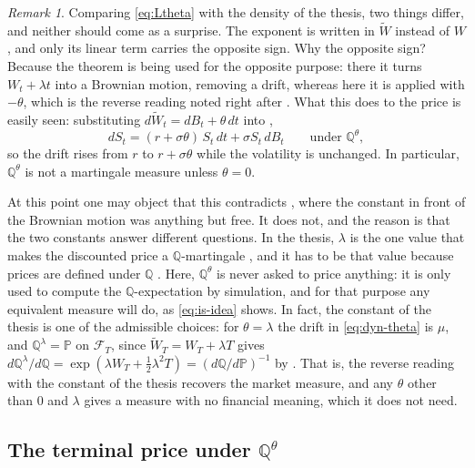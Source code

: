 \documentclass[11pt,a4paper]{article}
\theoremstyle{plain}
\theoremstyle{definition}
\theoremstyle{remark}
\newtheorem{remark}[theorem]{Remark}
\newcommand{\PP}{\mathbb{P}}
\newcommand{\Q}{\mathbb{Q}}
\newcommand{\F}{\mathcal{F}}
\newcommand{\1}{\mathbf{1}}
\newcommand{\Wt}{\widetilde{W}}
\newcommand{\Qt}{\Q^{\theta}}
\begin{document}
\begin{remark}\label{rem:sign}
Comparing \eqref{eq:Ltheta} with the density \cite[(5.12)]{tfg} of the thesis, two things differ, and neither should come as a surprise. The exponent is written in $\Wt$ instead of $W$, and only its linear term carries the opposite sign. Why the opposite sign? Because the theorem is being used for the opposite purpose: there it turns $W_t + \lambda t$ into a Brownian motion, removing a drift, whereas here it is applied with $-\theta$, which is the reverse reading noted right after \cite[Thm~4.20]{tfg}. What this does to the price is easily seen: substituting $d\Wt_t = dB_t + \theta\, dt$ into \cite[(5.15)]{tfg},
\begin{equation}\label{eq:dyn-theta}
  dS_t = (r + \sigma\theta)\, S_t\, dt + \sigma S_t\, dB_t \qquad \text{under } \Qt ,
\end{equation}
so the drift rises from $r$ to $r + \sigma\theta$ while the volatility is unchanged. In particular, $\Qt$ is not a martingale measure unless $\theta = 0$.

At this point one may object that this contradicts \cite[(5.11)]{tfg}, where the constant in front of the Brownian motion was anything but free. It does not, and the reason is that the two constants answer different questions. In the thesis, $\lambda$ is the one value that makes the discounted price a $\Q$-martingale \cite[(5.14)]{tfg}, and it has to be that value because prices are defined under $\Q$ \cite[Thm~5.7]{tfg}. Here, $\Qt$ is never asked to price anything: it is only used to compute the $\Q$-expectation \cite[(5.23)]{tfg} by simulation, and for that purpose any equivalent measure will do, as \eqref{eq:is-idea} shows. In fact, the constant of the thesis is one of the admissible choices: for $\theta = \lambda$ the drift in \eqref{eq:dyn-theta} is $\mu$, and $\Q^\lambda = \PP$ on $\F_T$, since $\Wt_T = W_T + \lambda T$ gives $d\Q^\lambda/d\Q = \exp(\lambda W_T + \tfrac12\lambda^2 T) = (d\Q/d\PP)^{-1}$ by \cite[(5.12)]{tfg}. That is, the reverse reading with the constant of the thesis recovers the market measure, and any $\theta$ other than $0$ and $\lambda$ gives a measure with no financial meaning, which it does not need.
\end{remark}

\subsection{The terminal price under \texorpdfstring{$\Qt$}{Q-theta}}
\end{document}
